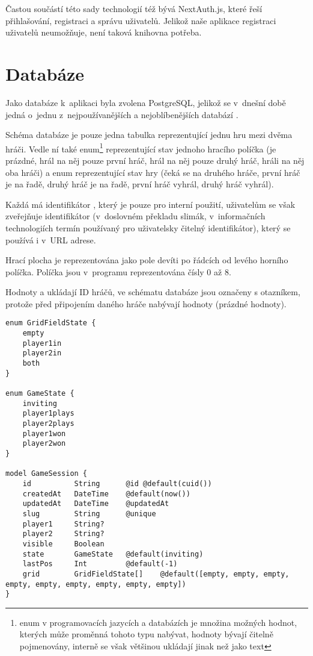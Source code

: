 Častou součástí této sady technologií též bývá NextAuth.js, které řeší
přihlašování, registraci a správu uživatelů. Jelikož naše aplikace registraci
uživatelů neumožňuje, není taková knihovna potřeba.

\section{Databáze}

Jako databáze k~aplikaci byla zvolena PostgreSQL, jelikož se v~dnešní době
jedná o~jednu z~nejpoužívanějších a nejoblíbenějších databází \cite{stackoverflow23}.

Schéma databáze je pouze jedna tabulka  reprezentující jednu hru
mezi dvěma hráči. Vedle ní také enum\footnote{enum v programovacích jazycích a
databázích je množina možných hodnot, kterých může proměnná tohoto typu
nabývat, hodnoty bývají čitelně pojmenovány, interně se však většinou ukládají
jinak než jako text}  reprezentující stav jednoho hracího
políčka (je prázdné, hrál na něj pouze první hráč, hrál na něj pouze druhý
hráč, hráli na něj oba hráči) a enum  reprezentující stav hry
(čeká se na druhého hráče, první hráč je na řadě, druhý hráč je na řadě, první
hráč vyhrál, druhý hráč vyhrál).

Každá  má identifikátor , který je pouze pro interní
použití, uživatelům se však zveřejňuje identifikátor  (v~doslovném
překladu slimák, v~informačních technologiích termín používaný pro uživatelsky
čitelný identifikátor), který se používá i v~URL adrese.\label{par:game-id}

\label{par:game-grid}
Hrací plocha je reprezentována jako pole devíti  po řádcích
od levého horního políčka. Políčka jsou v~programu reprezentována čísly 0 až 8.

Hodnoty  a  ukládají ID hráčů, ve schématu databáze jsou
označeny s otazníkem, protože před připojením daného hráče nabývají hodnoty
 (prázdné hodnoty).

\begin{lstlisting}[language=Prisma,caption={Schéma databáze},label={fig:db-schema}]
enum GridFieldState {
    empty
    player1in
    player2in
    both
}

enum GameState {
    inviting
    player1plays
    player2plays
    player1won
    player2won
}

model GameSession {
    id          String      @id @default(cuid())
    createdAt   DateTime    @default(now())
    updatedAt   DateTime    @updatedAt
    slug        String      @unique
    player1     String?
    player2     String?
    visible     Boolean
    state       GameState   @default(inviting)
    lastPos     Int         @default(-1)
    grid        GridFieldState[]    @default([empty, empty, empty, empty, empty, empty, empty, empty, empty])
}
\end{lstlisting}


